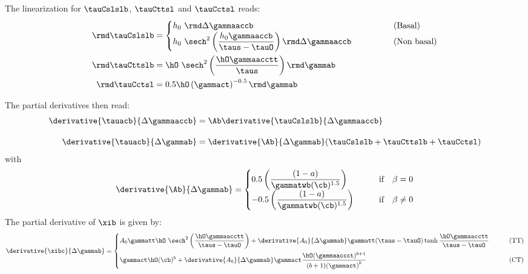   The linearization for $\tauCslslb$, $\tauCttsl$ and $\tauCctsl$ reads: 
  \begin{align}
          \rmd\tauCslslb &= 
          \begin{cases}  \displaystyle h_0 \ \rmd\Delta\gammaaccb & \qquad \qquad \text{(Basal)} 
            \\ \displaystyle h_0 \ \sech^2\left(\frac{h_0 \gammaaccb}{\taus - \tauO}\right) \rmd\Delta\gammaaccb & \qquad \qquad \text{(Non basal)}
          \end{cases}\\
          \rmd\tauCttslb &= \hO \ \sech^2\left(\frac{\hO\gammaacctt}{\taus}\right) \rmd\gammab \\
          \rmd\tauCctsl &= 0.5 \hO \left(\gammact\right)^{-0.5} \rmd\gammab
  \end{align}
  
  The partial derivatives then read:
  \begin{align}
    \derivative{\tauacb}{\Delta\gammaaccb} & = \Ab \derivative{\tauCslslb}{\Delta\gammaaccb} \\[10pt]
    \derivative{\tauacb}{\Delta\gammab} & = \derivative{\Ab}{\Delta\gammab} (\tauCslslb + \tauCttslb + \tauCctsl)
  \end{align}
  with
  \begin{equation}
    \derivative{\Ab}{\Delta\gammab} = 
    \begin{cases}
      \displaystyle 0.5 \left( \frac{(1-a)}{\gammatwb(\cb)^{1.5}} \right) & \qquad \text{if} \quad \beta = 0  \\
      \displaystyle - 0.5 \left( \frac{(1-a)}{\gammatwb(\cb)^{1.5}} \right) & \qquad \text{if} \quad \beta \neq 0  
    \end{cases}
  \end{equation}
  The partial derivative of $\xib$ is given by:
  \begin{equation}
    \derivative{\xibc}{\Delta\gammab} = 
    \begin{cases}
      \displaystyle A_0 \gammatt \hO \ \sech^2\left(\frac{\hO \gammaacctt}{\taus-\tauO}\right) + \derivative{A_0}{\Delta\gammab}  \gammatt (\taus-\tauO) \tanh{\frac{\hO \gammaacctt}{\taus-\tauO}} & \qquad \text{(TT)} \\[10pt]
      \displaystyle \gammact \hO (\cb)^{b} + \derivative{A_0}{\Delta\gammab} \gammact \frac{\hO (\gammaaccct)^{b+1}}{(b+1){(\gammact)}^b} & \qquad \text{(CT)} 
    \end{cases}
  \end{equation}
  
